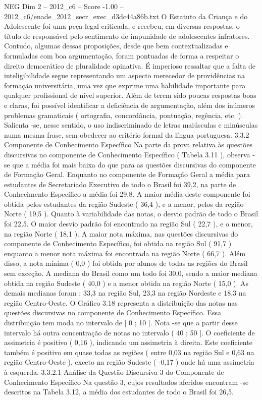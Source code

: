 \begin{textsample}{NEG Dim 2 – 2012\_c6 – Score -1.00 – 2012\_c6/enade\_2012\_secr\_exec\_d3dc44a86b.txt}
O Estatuto da Criança e do Adolescente foi uma peça legal criticada, e recebeu, em diversas respostas, o título de responsável pelo sentimento de impunidade de adolescentes infratores.
Contudo, algumas dessas proposições, desde que bem contextualizadas e formuladas com boa argumentação, foram pontuadas de forma a respeitar o direito democrático de pluralidade opinativa.
É imperioso ressaltar que a falta de inteligibilidade segue representando um aspecto merecedor de providências na formação universitária, uma vez que exprime uma habilidade importante para qualquer profissional de nível superior.
Além de terem sido poucas respostas boas e claras, foi possível identificar a deficiência de argumentação, além dos inúmeros problemas gramaticais ( ortografia, concordância, pontuação, regência, etc. ).
Salienta -se, nesse sentido, o uso indiscriminado de letras maiúsculas e minúsculas numa mesma frase, sem obedecer ao critério formal da língua portuguesa. 3.3.2 Componente de Conhecimento Específico Na parte da prova relativa às questões discursivas no componente de Conhecimento Específico ( Tabela 3.11 ), observa -se que a média foi mais baixa do que para as questões discursivas do componente de Formação Geral.
Enquanto no componente de Formação Geral a média para estudantes de Secretariado Executivo de todo o Brasil foi 39,2, na parte de Conhecimento Específico a média foi 29,8.
A maior média deste componente foi obtida pelos estudantes da região Sudeste ( 36,4 ), e a menor, pelos da região Norte ( 19,5 ).
Quanto à variabilidade das notas, o desvio padrão de todo o Brasil foi 22,5.
O maior desvio padrão foi encontrado na região Sul ( 22,7 ), e o menor, na região Norte ( 18,1 ).
A maior nota máxima, nas questões discursivas do componente de Conhecimento Específico, foi obtida na região Sul ( 91,7 ) enquanto a menor nota máxima foi encontrada na região Norte ( 66,7 ).
Além disso, a nota mínima ( 0,0 ) foi obtida por alunos de todas as regiões do Brasil sem exceção.
A mediana do Brasil como um todo foi 30,0, sendo a maior mediana obtida na região Sudeste ( 40,0 ) e a menor obtida na região Norte ( 15,0 ).
As demais medianas foram : 33,3 na região Sul, 23,3 na região Nordeste e 18,3 na região Centro-Oeste.
O Gráfico 3.18 representa a distribuição das notas nas questões discursivas no componente de Conhecimento Específico.
Essa distribuição tem moda no intervalo de [ 0 ; 10 ].
Nota -se que a partir desse intervalo há outra concentração de notas no intervalo ( 40 ; 50 ].
O coeficiente de assimetria é positivo ( 0,16 ), indicando um assimetria à direita.
Este coeficiente também é positivo em quase todas as regiões ( entre 0,03 na região Sul e 0,63 na região Centro-Oeste ), exceto na região Sudeste ( -0,17 ) onde há uma assimetria à esquerda. 3.3.2.1 Análise da Questão Discursiva 3 do Componente de Conhecimento Específico Na questão 3, cujos resultados aferidos encontram -se descritos na Tabela 3.12, a média dos estudantes de todo o Brasil foi 26,5.

\end{textsample}
